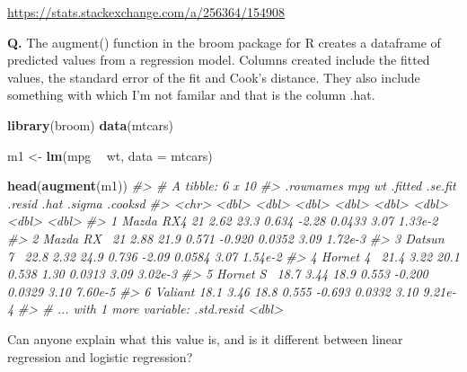 \documentclass[]{book}
\newenvironment{Shaded}{\begin{snugshade}}{\end{snugshade}}
\newcommand{\CommentTok}[1]{\textcolor[rgb]{0.56,0.35,0.01}{\textit{#1}}}
\newcommand{\DataTypeTok}[1]{\textcolor[rgb]{0.13,0.29,0.53}{#1}}
\newcommand{\KeywordTok}[1]{\textcolor[rgb]{0.13,0.29,0.53}{\textbf{#1}}}
\newcommand{\NormalTok}[1]{#1}
\newcommand{\OperatorTok}[1]{\textcolor[rgb]{0.81,0.36,0.00}{\textbf{#1}}}
\newcommand{\StringTok}[1]{\textcolor[rgb]{0.31,0.60,0.02}{#1}}
\begin{document}
\url{https://stats.stackexchange.com/a/256364/154908}

\textbf{Q.} The augment() function in the broom package for R creates a dataframe of predicted values from a regression model. Columns created include the fitted values, the standard error of the fit and Cook's distance. They also include something with which I'm not familar and that is the column .hat.

\begin{Shaded}
\begin{Highlighting}[]
\KeywordTok{library}\NormalTok{(broom)}
\KeywordTok{data}\NormalTok{(mtcars)}

\NormalTok{m1 <-}\StringTok{ }\KeywordTok{lm}\NormalTok{(mpg }\OperatorTok{~}\StringTok{ }\NormalTok{wt, }\DataTypeTok{data =}\NormalTok{ mtcars)}

\KeywordTok{head}\NormalTok{(}\KeywordTok{augment}\NormalTok{(m1))}
\CommentTok{#> # A tibble: 6 x 10}
\CommentTok{#>   .rownames   mpg    wt .fitted .se.fit .resid   .hat .sigma .cooksd}
\CommentTok{#>   <chr>     <dbl> <dbl>   <dbl>   <dbl>  <dbl>  <dbl>  <dbl>   <dbl>}
\CommentTok{#> 1 Mazda RX4  21    2.62    23.3   0.634 -2.28  0.0433   3.07 1.33e-2}
\CommentTok{#> 2 Mazda RX~  21    2.88    21.9   0.571 -0.920 0.0352   3.09 1.72e-3}
\CommentTok{#> 3 Datsun 7~  22.8  2.32    24.9   0.736 -2.09  0.0584   3.07 1.54e-2}
\CommentTok{#> 4 Hornet 4~  21.4  3.22    20.1   0.538  1.30  0.0313   3.09 3.02e-3}
\CommentTok{#> 5 Hornet S~  18.7  3.44    18.9   0.553 -0.200 0.0329   3.10 7.60e-5}
\CommentTok{#> 6 Valiant    18.1  3.46    18.8   0.555 -0.693 0.0332   3.10 9.21e-4}
\CommentTok{#> # ... with 1 more variable: .std.resid <dbl>}
\end{Highlighting}
\end{Shaded}

\begin{Shaded}
\end{Shaded}

Can anyone explain what this value is, and is it different between linear regression and logistic regression?
\end{document}
